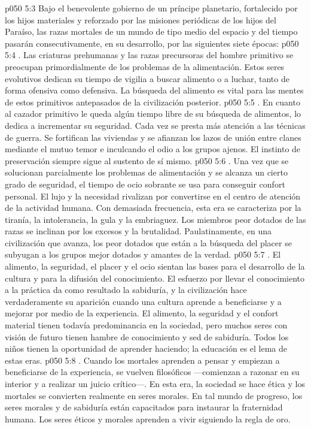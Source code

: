 \vs p050 5:3 Bajo el benevolente gobierno de un príncipe planetario, fortalecido por los hijos materiales y reforzado por las misiones periódicas de los hijos del Paraíso, las razas mortales de un mundo de tipo medio del espacio y del tiempo pasarán consecutivamente, en su desarrollo, por las siguientes siete épocas:
\vs p050 5:4 . Las criaturas prehumanas y las razas precursoras del hombre primitivo se preocupan primordialmente de los problemas de la alimentación. Estos seres evolutivos dedican su tiempo de vigilia a buscar alimento o a luchar, tanto de forma ofensiva como defensiva. La búsqueda del alimento es vital para las mentes de estos primitivos antepasados de la civilización posterior.
\vs p050 5:5 . En cuanto al cazador primitivo le queda algún tiempo libre de su búsqueda de alimentos, lo dedica a incrementar su seguridad. Cada vez se presta más atención a las técnicas de guerra. Se fortifican las viviendas y se afianzan los lazos de unión entre clanes mediante el mutuo temor e inculcando el odio a los grupos ajenos. El instinto de preservación siempre sigue al sustento de sí mismo.
\vs p050 5:6 . Una vez que se solucionan parcialmente los problemas de alimentación y se alcanza un cierto grado de seguridad, el tiempo de ocio sobrante se usa para conseguir confort personal. El lujo y la necesidad rivalizan por convertirse en el centro de atención de la actividad humana. Con demasiada frecuencia, esta era se caracteriza por la tiranía, la intolerancia, la gula y la embriaguez. Los miembros peor dotados de las razas se inclinan por los excesos y la brutalidad. Paulatinamente, en una civilización que avanza, los peor dotados que están a la búsqueda del placer se subyugan a los grupos mejor dotados y amantes de la verdad.
\vs p050 5:7 . El alimento, la seguridad, el placer y el ocio sientan las bases para el desarrollo de la cultura y para la difusión del conocimiento. El esfuerzo por llevar el conocimiento a la práctica da como resultado la sabiduría, y la civilización hace verdaderamente su aparición cuando una cultura aprende a beneficiarse y a mejorar por medio de la experiencia. El alimento, la seguridad y el confort material tienen todavía predominancia en la sociedad, pero muchos seres con visión de futuro tienen hambre de conocimiento y sed de sabiduría. Todos los niños tienen la oportunidad de aprender haciendo; la educación es el lema de estas eras.
\vs p050 5:8 . Cuando los mortales aprenden a pensar y empiezan a beneficiarse de la experiencia, se vuelven filosóficos ---comienzan a razonar en su interior y a realizar un juicio crítico---. En esta era, la sociedad se hace ética y los mortales se convierten realmente en seres morales. En tal mundo de progreso, los seres morales y de sabiduría están capacitados para instaurar la fraternidad humana. Los seres éticos y morales aprenden a vivir siguiendo la regla de oro.
